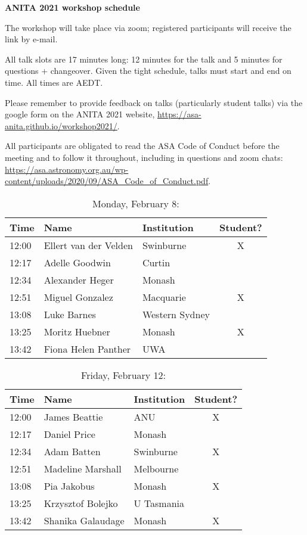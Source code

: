 \documentclass[amsmath,onecolumn]{revtex4-1}
\begin{document}
\begin{center}
{\bf ANITA 2021 workshop schedule}\\
\end{center}
\vspace{0.2in}

The workshop will take place via zoom; registered participants will receive the link by e-mail.  

All talk slots are 17 minutes long: 12 minutes for the talk and 5 minutes for questions + changeover.  Given the tight schedule, talks must start and end on time.  All times are AEDT.

Please remember to provide feedback on talks (particularly student talks) via the google form on the ANITA 2021 website, \url{https://asa-anita.github.io/workshop2021/}.

All participants are obligated to read the ASA Code of Conduct before the meeting and to follow it throughout, including in questions and zoom chats:
\url{https://asa.astronomy.org.au/wp-content/uploads/2020/09/ASA_Code_of_Conduct.pdf}.

\FloatBarrier

\begin{table}[!htbp]
	\centering
	\caption{Monday, February 8:}
\begin{tabular}{| l | l | l | c |}
	\hline
	Time & Name  & Institution & Student? \\ 		
	\hline
	12:00 & Ellert van der Velden & Swinburne & X \\
	12:17 & Adelle Goodwin & Curtin & \\
	12:34 & Alexander	Heger & Monash & \\
	12:51 & 	Miguel	Gonzalez & Macquarie & X\\
	13:08 & Luke	Barnes & Western Sydney & \\
	13:25 & Moritz	Huebner & Monash & X \\
	13:42 &  Fiona Helen	Panther  & UWA &  \\
	\hline
\end{tabular}
\end{table}

\begin{table}[!htbp]
	\centering
	\caption{Friday, February 12:}
\begin{tabular}{| l | l | l | c |}
	\hline
	Time & Name  & Institution & Student? \\ 		
	\hline
	12:00 & James	Beattie & ANU  & X \\
	12:17 & Daniel Price & Monash & \\
	12:34 & Adam	Batten & Swinburne & X \\
	12:51 & Madeline	Marshall &  Melbourne & \\
	13:08 & Pia	Jakobus & Monash & X \\
	13:25 & Krzysztof 	Bolejko & U Tasmania  &	\\
	13:42 & Shanika	Galaudage & Monash & X\\
	\hline
\end{tabular}
\end{table}
\end{document}
